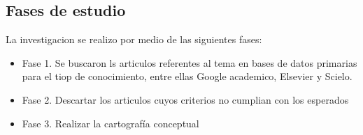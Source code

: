 \subsection{Fases de estudio}

La investigacion se realizo por medio de las siguientes fases:

\begin{itemize}
   \item Fase 1. Se buscaron ls articulos referentes al tema en bases de datos primarias para el tiop de conocimiento, entre ellas Google academico, Elsevier y Scielo.
      
   \item Fase 2. Descartar los articulos cuyos criterios no cumplian con los esperados
   \item Fase 3. Realizar la cartografía conceptual
\end{itemize}

%

